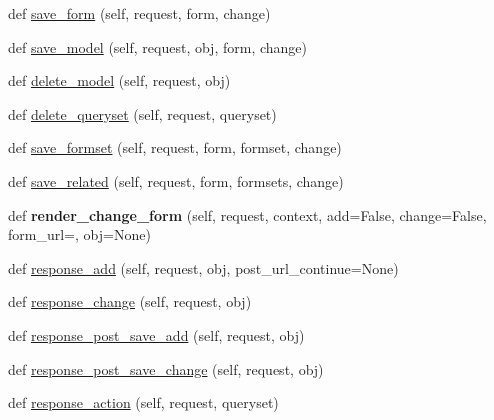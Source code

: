 \begin{DoxyCompactItemize}
def \mbox{\hyperlink{classdjango_1_1contrib_1_1admin_1_1options_1_1_model_admin_a12a97f6122978f998d92d24b11c086db}{save\+\_\+form}} (self, request, form, change)
\item 
def \mbox{\hyperlink{classdjango_1_1contrib_1_1admin_1_1options_1_1_model_admin_ae951afd1543df5c2a7fe9ff6f799fc42}{save\+\_\+model}} (self, request, obj, form, change)
\item 
def \mbox{\hyperlink{classdjango_1_1contrib_1_1admin_1_1options_1_1_model_admin_a9a6170cff90cae334989f1c511b35729}{delete\+\_\+model}} (self, request, obj)
\item 
def \mbox{\hyperlink{classdjango_1_1contrib_1_1admin_1_1options_1_1_model_admin_ad4a64708b548f55b98e5a93f52c539fc}{delete\+\_\+queryset}} (self, request, queryset)
\item 
def \mbox{\hyperlink{classdjango_1_1contrib_1_1admin_1_1options_1_1_model_admin_a7dd8430cd0a83b84927b16e1e335c678}{save\+\_\+formset}} (self, request, form, formset, change)
\item 
def \mbox{\hyperlink{classdjango_1_1contrib_1_1admin_1_1options_1_1_model_admin_a765325eaac5c72bca4c5d2977c87d6fc}{save\+\_\+related}} (self, request, form, formsets, change)
\item 
\mbox{\label{classdjango_1_1contrib_1_1admin_1_1options_1_1_model_admin_a60da48aa4133d01605a414bfe9dcb486}} 
def {\bfseries render\+\_\+change\+\_\+form} (self, request, context, add=False, change=False, form\+\_\+url=\textquotesingle{}\textquotesingle{}, obj=None)
\item 
def \mbox{\hyperlink{classdjango_1_1contrib_1_1admin_1_1options_1_1_model_admin_a2ee06720815845c7a2dd5ff4d4287c79}{response\+\_\+add}} (self, request, obj, post\+\_\+url\+\_\+continue=None)
\item 
def \mbox{\hyperlink{classdjango_1_1contrib_1_1admin_1_1options_1_1_model_admin_a244635d3cdbb7a8934f982b641ab2a4a}{response\+\_\+change}} (self, request, obj)
\item 
def \mbox{\hyperlink{classdjango_1_1contrib_1_1admin_1_1options_1_1_model_admin_a62f3d9a54481aa167e0acdc2770e00fb}{response\+\_\+post\+\_\+save\+\_\+add}} (self, request, obj)
\item 
def \mbox{\hyperlink{classdjango_1_1contrib_1_1admin_1_1options_1_1_model_admin_a064e976abb4dfd5c91d505ae69ecc53a}{response\+\_\+post\+\_\+save\+\_\+change}} (self, request, obj)
\item 
def \mbox{\hyperlink{classdjango_1_1contrib_1_1admin_1_1options_1_1_model_admin_a3c460b92c84678ac41d455e3e891961f}{response\+\_\+action}} (self, request, queryset)

\end{DoxyCompactItemize}
